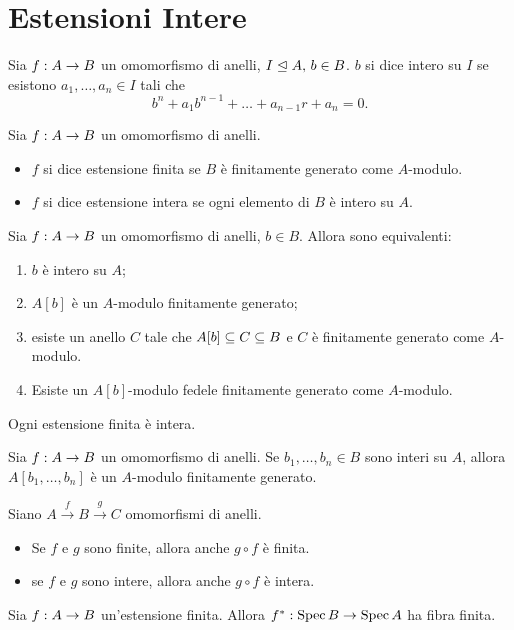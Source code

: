 \section{Estensioni Intere}

\begin{definition}
Sia $f:A\rightarrow B$ un omomorfismo di anelli, $I\trianglelefteq A,\,\allowbreak b\in B$. $b$ si dice intero su $I$ se esistono $a_1,\ldots,a_n\in I$ tali che
$$
b^n+a_1b^{n-1}+\ldots+a_{n-1}r+a_n=0.
$$
\end{definition}
\begin{definition}
Sia $f:A\rightarrow B$ un omomorfismo di anelli.
\begin{itemize}
\item $f$ si dice estensione finita se $B$ è finitamente generato come $A$-modulo.
\item $f$ si dice estensione intera se ogni elemento di $B$ è intero su $A$.
\end{itemize}
\end{definition}
\begin{proposition}
Sia $f:A\rightarrow B$ un omomorfismo di anelli, $b\in B$. Allora sono equivalenti:
\begin{enumerate}
\item $b$ è intero su $A$;
\item $A[b]$ è un $A$-modulo finitamente generato;
\item esiste un anello $C$ tale che $A[b]\subseteq C\subseteq B$ e $C$ è finitamente generato come $A$-modulo.
\item Esiste un $A[b]$-modulo fedele finitamente generato come $A$-modulo.
\end{enumerate}
\end{proposition}
\begin{corollary}
Ogni estensione finita è intera.
\end{corollary}
\begin{corollary}
Sia $f:A\rightarrow B$ un omomorfismo di anelli. Se $b_1,\ldots,b_n\in B$ sono interi su $A$, allora $A[b_1,\ldots,b_n]$ è un $A$-modulo finitamente generato.
\end{corollary}
\begin{proposition}
Siano $A\xrightarrow{f}B\xrightarrow{g}C$ omomorfismi di anelli.
\begin{itemize}
\item Se $f$ e $g$ sono finite, allora anche $g\circ f$ è finita.
\item se $f$ e $g$ sono intere, allora anche $g\circ f$ è intera.
\end{itemize}
\begin{proposition}
Sia $f:A\rightarrow B$ un'estensione finita. Allora $f^*:\operatorname{Spec} B\rightarrow \operatorname{Spec} A$ ha fibra finita.
\end{proposition}
\end{proposition}
